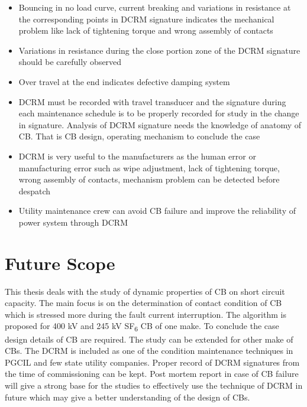 \begin{itemize}
\item Bouncing in no load curve, current breaking and variations in resistance at the corresponding points in DCRM signature indicates the mechanical problem like lack of tightening torque and wrong assembly of contacts

\item Variations in resistance during the close portion zone of the DCRM signature should be carefully observed

\item Over travel at the end indicates defective damping system

\item DCRM must be recorded with travel transducer and the signature during each maintenance schedule is to be properly recorded for study in the change in signature. Analysis of DCRM signature needs the knowledge of anatomy of CB. That is CB design, operating mechanism to conclude the case

\item DCRM is very useful to the manufacturers as the human error or manufacturing error such as wipe adjustment, lack of tightening torque, wrong assembly of contacts, mechanism problem can be detected before despatch

\item Utility maintenance crew can avoid CB failure and improve the reliability of power system through DCRM
\end{itemize}
 
\clearpage
\section{Future Scope}
This thesis deals with the study of dynamic properties of CB on short circuit capacity. The main focus is on the determination of contact condition of CB which is stressed more during the fault current interruption. The algorithm is proposed for 400 kV and 245 kV SF\textsubscript{6} CB of one make. To conclude the case design details of CB are required. The study can be extended for other make of CBs. The DCRM is included as one of the condition maintenance techniques in PGCIL and few state utility companies. Proper record of DCRM signatures from the time of commissioning can be kept. Post mortem report in case of CB failure will give a strong base for the studies to effectively use the technique of DCRM in future which may give a better understanding of the design of CBs.

